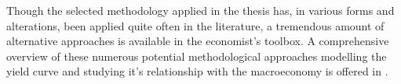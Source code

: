 
Though the selected methodology applied in the thesis has, in various forms and alterations, been applied quite often in the literature, a tremendous amount of alternative approaches is available in the economist's toolbox. 
A comprehensive overview of these numerous potential methodological approaches modelling the yield curve and studying it's relationship with the macroeconomy is offered in \citet{diebold2013yield}. 
